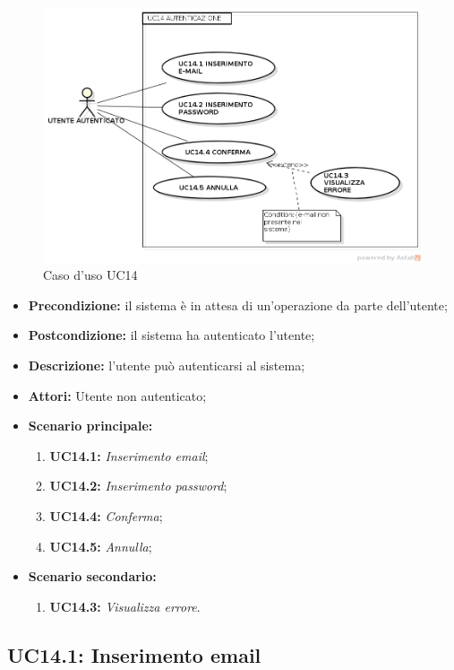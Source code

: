 \begin{figure}[h]
	\begin{center}
	\includegraphics[scale=0.4]{diagram/UC14.png}
	\caption{Caso d'uso UC14}
	\end{center}
\end{figure}
\begin{itemize}
	\item \textbf{Precondizione:} il sistema è in attesa di un'operazione da parte dell'utente;
	\item \textbf{Postcondizione:} il sistema ha autenticato l'utente;
	\item \textbf{Descrizione:} l'utente può autenticarsi al sistema;
	\item \textbf{Attori:} Utente non autenticato;
	\item \textbf{Scenario principale:}
	\begin{enumerate}
		\item \textbf{ UC14.1:} \textit{ Inserimento email};
		\item \textbf{ UC14.2:} \textit{ Inserimento password};
		\item \textbf{ UC14.4:} \textit{ Conferma};
		\item \textbf{ UC14.5:} \textit{ Annulla};
	\end{enumerate}
	\item \textbf{Scenario secondario:}
	\begin{enumerate}
		\item \textbf{ UC14.3:} \textit{ Visualizza errore}.
	\end{enumerate}
\end{itemize}
\subsection{ UC14.1: Inserimento email}

